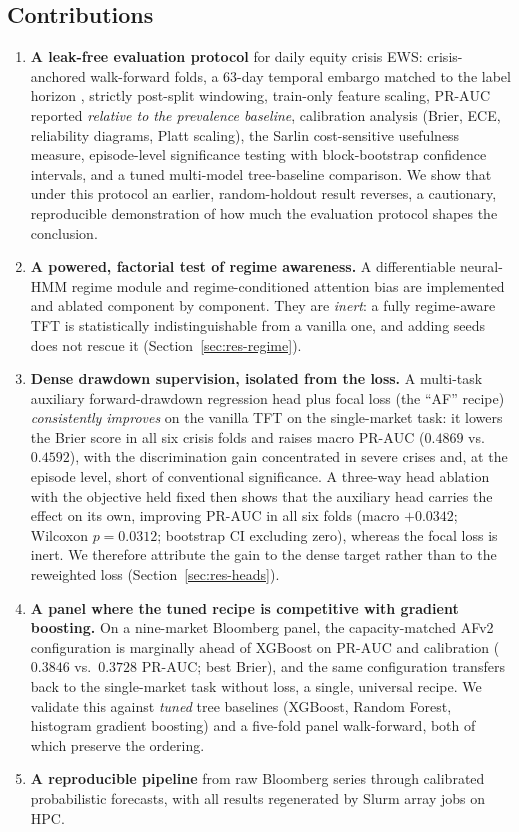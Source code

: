 \documentclass[11pt,a4paper]{article}
\newcommand{\prauc}{\mbox{PR-AUC}}
\begin{document}
\subsection{Contributions}
\begin{enumerate}
\item \textbf{A leak-free evaluation protocol} for daily equity crisis EWS:
crisis-anchored walk-forward folds, a 63-day temporal embargo matched to the
label horizon \citep{lopezdeprado2018}, strictly post-split windowing,
train-only feature scaling, $\prauc$ reported \emph{relative to the prevalence
baseline}, calibration analysis (Brier, ECE, reliability diagrams, Platt
scaling), the Sarlin \citeyearpar{sarlin2013biggest} cost-sensitive usefulness
measure, episode-level significance testing with block-bootstrap confidence
intervals, and a tuned multi-model tree-baseline comparison. We show that under
this protocol an earlier, random-holdout result reverses, a cautionary,
reproducible demonstration of how much the evaluation protocol shapes the
conclusion.
\item \textbf{A powered, factorial test of regime awareness.} A differentiable
neural-HMM regime module and regime-conditioned attention bias are implemented
and ablated component by component. They are \emph{inert}: a fully regime-aware
TFT is statistically indistinguishable from a vanilla one, and adding seeds
does not rescue it (Section~\ref{sec:res-regime}).
\item \textbf{Dense drawdown supervision, isolated from the loss.} A multi-task
auxiliary forward-drawdown regression head plus focal loss (the ``AF'' recipe)
\emph{consistently improves} on the vanilla TFT on the single-market task: it
lowers the Brier score in all six crisis folds and raises macro $\prauc$
($0.4869$ vs.\ $0.4592$), with the discrimination gain concentrated in severe
crises and, at the episode level, short of conventional significance. A
three-way head ablation with the objective held fixed then shows that the
auxiliary head carries the effect on its own, improving $\prauc$ in all six
folds (macro $+0.0342$; Wilcoxon $p=0.0312$; bootstrap CI excluding zero),
whereas the focal loss is inert. We therefore attribute the gain to the dense
target rather than to the reweighted loss (Section~\ref{sec:res-heads}).
\item \textbf{A panel where the tuned recipe is competitive with gradient
boosting.} On a nine-market Bloomberg panel, the capacity-matched AFv2
configuration is marginally ahead of XGBoost on $\prauc$ and calibration
($0.3846$ vs.\ $0.3728$ $\prauc$; best Brier), and the same configuration
transfers back to the single-market task without loss, a single, universal
recipe. We validate this against \emph{tuned} tree baselines (XGBoost, Random
Forest, histogram gradient boosting) and a five-fold panel walk-forward, both of
which preserve the ordering.
\item \textbf{A reproducible pipeline} from raw Bloomberg series through
calibrated probabilistic forecasts, with all results regenerated by Slurm
array jobs on HPC.
\end{enumerate}
\end{document}
